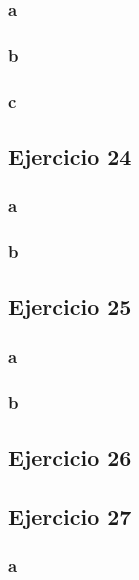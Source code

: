 \documentclass{article}
\begin{document}
\subsubsection*{a}

\subsubsection*{b}

\subsubsection*{c}

\subsection*{Ejercicio 24}

\subsubsection*{a}

\subsubsection*{b}

\subsection*{Ejercicio 25}

\subsubsection*{a}

\subsubsection*{b}

\subsection*{Ejercicio 26}

\subsection*{Ejercicio 27}

\subsubsection*{a}
\end{document}
